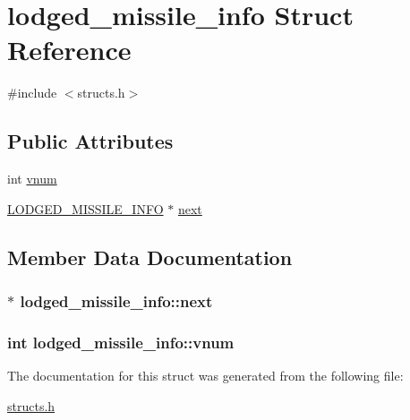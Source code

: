 \hypertarget{structlodged__missile__info}{\section{lodged\-\_\-missile\-\_\-info Struct Reference}
\label{structlodged__missile__info}
}


{\ttfamily \#include $<$structs.\-h$>$}

\subsection*{Public Attributes}
\begin{DoxyCompactItemize}
\item 
int \hyperlink{structlodged__missile__info_ade946e71299b2a8e33c02020be47e236}{vnum}
\item 
\hyperlink{structs_8h_a66f294978ab003b062c4b8590bf03b19}{L\-O\-D\-G\-E\-D\-\_\-\-M\-I\-S\-S\-I\-L\-E\-\_\-\-I\-N\-F\-O} $\ast$ \hyperlink{structlodged__missile__info_a60fed130734a4ff21304fb3520c2f7da}{next}
\end{DoxyCompactItemize}


\subsection{Member Data Documentation}
\hypertarget{structlodged__missile__info_a60fed130734a4ff21304fb3520c2f7da}{
\subsubsection[{next}]{$\ast$ lodged\-\_\-missile\-\_\-info\-::next}}\label{structlodged__missile__info_a60fed130734a4ff21304fb3520c2f7da}
\hypertarget{structlodged__missile__info_ade946e71299b2a8e33c02020be47e236}{
\subsubsection[{vnum}]{\setlength{\rightskip}{0pt plus 5cm}int lodged\-\_\-missile\-\_\-info\-::vnum}}\label{structlodged__missile__info_ade946e71299b2a8e33c02020be47e236}


The documentation for this struct was generated from the following file\-:\begin{DoxyCompactItemize}
\item 
\hyperlink{structs_8h}{structs.\-h}\end{DoxyCompactItemize}
